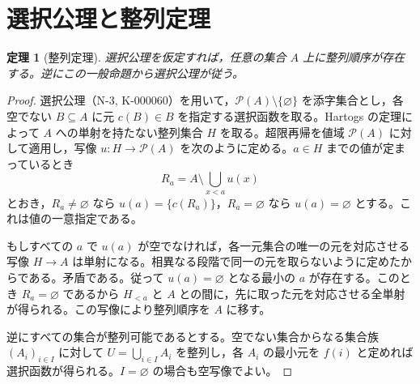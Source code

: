 \documentclass[a5paper,10pt,dvipdfmx]{jsarticle}
\theoremstyle{definition}
\theoremstyle{plain}
\newtheorem{thm}[ruledef]{定理}
\newcommand{\Pow}{\mathcal{P}}
\begin{document}
\section{選択公理と整列定理}
\begin{thm}[整列定理]\label{k129}
選択公理を仮定すれば，任意の集合 $A$ 上に整列順序が存在する。逆にこの一般命題から選択公理が従う。
\end{thm}
\begin{proof}
選択公理（N-3, K-000060）を用いて，$\Pow(A)\setminus\{\varnothing\}$ を添字集合とし，各空でない $B\subseteq A$ に元 $c(B)\in B$ を指定する選択函数を取る。Hartogs の定理によって $A$ への単射を持たない整列集合 $H$ を取る。超限再帰を値域 $\Pow(A)$ に対して適用し，写像 $u\colon H\to\Pow(A)$ を次のように定める。$a\in H$ までの値が定まっているとき
\[ R_a=A\setminus\bigcup_{x<a}u(x) \]
とおき，$R_a\ne\varnothing$ なら $u(a)=\{c(R_a)\}$，$R_a=\varnothing$ なら $u(a)=\varnothing$ とする。これは値の一意指定である。

もしすべての $a$ で $u(a)$ が空でなければ，各一元集合の唯一の元を対応させる写像 $H\to A$ は単射になる。相異なる段階で同一の元を取らないように定めたからである。矛盾である。従って $u(a)=\varnothing$ となる最小の $a$ が存在する。このとき $R_a=\varnothing$ であるから $H_{<a}$ と $A$ との間に，先に取った元を対応させる全単射が得られる。この写像により整列順序を $A$ に移す。

逆にすべての集合が整列可能であるとする。空でない集合からなる集合族 $(A_i)_{i\in I}$ に対して $U=\bigcup_{i\in I}A_i$ を整列し，各 $A_i$ の最小元を $f(i)$ と定めれば選択函数が得られる。$I=\varnothing$ の場合も空写像でよい。
\end{proof}
\end{document}
